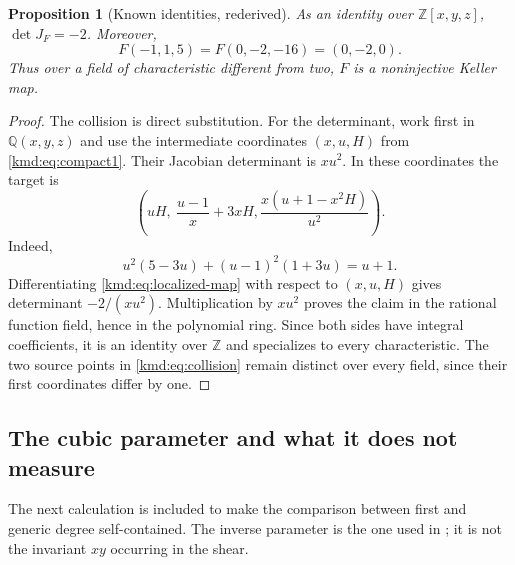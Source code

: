 \documentclass[11pt,a4paper]{article}
\numberwithin{equation}{section}
\newtheorem{proposition}[theorem]{Proposition}
\theoremstyle{definition}
\theoremstyle{remark}
\newcommand{\Q}{\mathbb Q}
\newcommand{\Z}{\mathbb Z}
\begin{document}
\begin{proposition}[Known identities, rederived]\label{kmd:prop:baseline}
As an identity over $\Z[x,y,z]$, $\det J_F=-2$. Moreover,
\begin{equation}
 F(-1,1,5)=F(0,-2,-16)=(0,-2,0).
 \label{kmd:eq:collision}
\end{equation}
Thus over a field of characteristic different from two, $F$ is a
noninjective Keller map.
\end{proposition}
\begin{proof}
The collision is direct substitution. For the determinant, work first
in $\Q(x,y,z)$ and use the intermediate coordinates $(x,u,H)$ from
\eqref{kmd:eq:compact1}. Their Jacobian determinant is $xu^2$. In these
coordinates the target is
\begin{equation}
 \left(uH,\ \frac{u-1}{x}+3xH,
 \frac{x(u+1-x^2H)}{u^2}\right).
 \label{kmd:eq:localized-map}
\end{equation}
Indeed,
\[
 u^2(5-3u)+(u-1)^2(1+3u)=u+1.
\]
Differentiating \eqref{kmd:eq:localized-map} with respect to $(x,u,H)$
gives determinant $-2/(xu^2)$. Multiplication by $xu^2$ proves the
claim in the rational function field, hence in the polynomial ring.
Since both sides have integral coefficients, it is an identity over
$\Z$ and specializes to every characteristic. The two source points
in \eqref{kmd:eq:collision} remain distinct over every field, since their
first coordinates differ by one.
\end{proof}

\subsection{The cubic parameter and what it does not measure}
The next calculation is included to make the comparison between first
and generic degree self-contained. The inverse parameter is the one
used in \cite{arithmetic}; it is not the invariant $xy$ occurring in
the shear.
\end{document}
